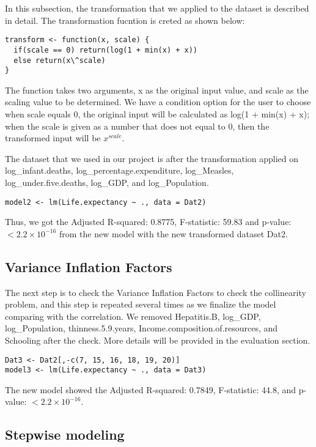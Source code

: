In this subsection, the transformation that we applied to the dataset is described in detail. The transformation fucntion is creted as shown below:

\begin{verbatim}
transform <- function(x, scale) {
  if(scale == 0) return(log(1 + min(x) + x))
  else return(x\^scale)
}
\end{verbatim}

The function takes two arguments, x as the original input value, and scale as the scaling value to be determined. We have a condition option for the user to choose when scale equals 0, the original input will be calculated as log(1 + min(x) + x); when the scale is given as a number that does not equal to 0, then the transformed input will be $x^{scale}$.

The dataset that we used in our project is after the transformation applied on log\_infant.deaths, log\_percentage.expenditure, log\_Measles, log\_under.five.deaths, log\_GDP, and log\_Population.

\begin{verbatim}
model2 <- lm(Life.expectancy ~ ., data = Dat2)
\end{verbatim}

Thus, we got the Adjusted R-squared: 0.8775, F-statistic: 59.83 and p-value: $< 2.2\times 10^{-16}$ from the new model with the new transformed dataset Dat2.

\subsection{Variance Inflation Factors}

The next step is to check the Variance Inflation Factors to check the collinearity problem, and this step is repeated several times as we finalize the model comparing with the correlation. We removed Hepatitis.B, log\_GDP, log\_Population, thinness.5.9.years, Income.composition.of.resources, and Schooling after the check. More details will be provided in the evaluation section.


\begin{verbatim}
Dat3 <- Dat2[,-c(7, 15, 16, 18, 19, 20)]
model3 <- lm(Life.expectancy ~ ., data = Dat3)
\end{verbatim}
The new model showed the Adjusted R-squared: 0.7849, F-statistic:  44.8, and p-value: $< 2.2\times 10^{-16}$.


\subsection{Stepwise modeling}

